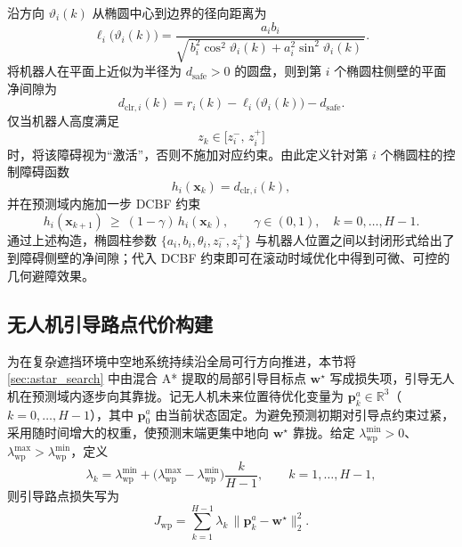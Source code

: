 沿方向 \(\vartheta_i(k)\) 从椭圆中心到边界的径向距离为
\begin{equation}
\ell_i\big(\vartheta_i(k)\big)
=\frac{a_i b_i}{\sqrt{\,b_i^{2}\cos^{2}\!\vartheta_i(k)+a_i^{2}\sin^{2}\!\vartheta_i(k)\,}}.
\label{eq:ellipse_radius_cos_form}
\end{equation}
将机器人在平面上近似为半径为 \(d_{\mathrm{safe}}>0\) 的圆盘，则到第 \(i\) 个椭圆柱侧壁的平面净间隙为
\begin{equation}
d_{\mathrm{clr},i}(k)=r_i(k)-\ell_i\big(\vartheta_i(k)\big)-d_{\mathrm{safe}}.
\label{eq:clearance_def}
\end{equation}
仅当机器人高度满足
\begin{equation}
z_k\in\big[z_i^{-},\,z_i^{+}\big]
\label{eq:height_active}
\end{equation}
时，将该障碍视为“激活”，否则不施加对应约束。由此定义针对第 \(i\) 个椭圆柱的控制障碍函数
\begin{equation}
h_i(\mathbf{x}_k)=d_{\mathrm{clr},i}(k),
\label{eq:cbf_hi}
\end{equation}
并在预测域内施加一步 DCBF 约束
\begin{equation}
h_i(\mathbf{x}_{k+1})\ \ge\ (1-\gamma)\,h_i(\mathbf{x}_k),
\qquad \gamma\in(0,1),\quad k=0,\ldots,H-1.
\label{eq:dcbf_constraint_ec}
\end{equation}
通过上述构造，椭圆柱参数 \(\{a_i,b_i,\theta_i,z_i^{-},z_i^{+}\}\) 与机器人位置之间以封闭形式给出了到障碍侧壁的净间隙；代入 DCBF 约束即可在滚动时域优化中得到可微、可控的几何避障效果。

\subsection{无人机引导路点代价构建}\label{sec:astar_wp}

为在复杂遮挡环境中空地系统持续沿全局可行方向推进，本节将 \autoref{sec:astar_search} 中由混合 A* 提取的局部引导目标点 \(\mathbf{w}^\star\) 写成损失项，引导无人机在预测域内逐步向其靠拢。记无人机未来位置待优化变量为 \(\mathbf{p}^{a}_k\in\mathbb{R}^3\)（\(k=0,\dots,H-1\)），其中 \(\mathbf{p}^{a}_0\) 由当前状态固定。为避免预测初期对引导点约束过紧，采用随时间增大的权重，使预测末端更集中地向 \(\mathbf{w}^\star\) 靠拢。给定 \(\lambda^{\min}_{\mathrm{wp}}>0\)、\(\lambda^{\max}_{\mathrm{wp}}>\lambda^{\min}_{\mathrm{wp}}\)，定义
\begin{equation}
\lambda_k=\lambda^{\min}_{\mathrm{wp}}
+\big(\lambda^{\max}_{\mathrm{wp}}-\lambda^{\min}_{\mathrm{wp}}\big)\frac{k}{H-1},
\qquad k=1,\dots,H-1,
\label{eq:wp_lambda}
\end{equation}
则引导路点损失写为
\begin{equation}
J_{\mathrm{wp}}=
\sum_{k=1}^{H-1}\lambda_k\,\big\|\mathbf{p}^{a}_k-\mathbf{w}^\star\big\|_2^2.
\label{eq:wp_cost}
\end{equation}

